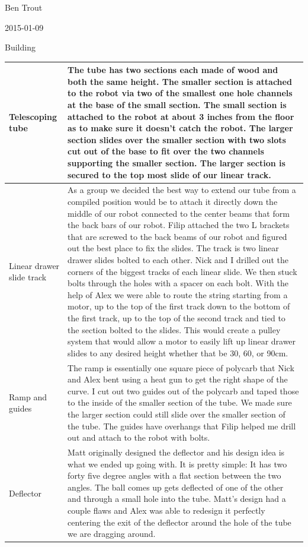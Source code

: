 Ben Trout

2015-01-09

Building

\begin{tabular}{|p{4cm}|p{8cm}|}
\hline
Telescoping tube&
The tube has two sections each made of wood and both the same height. The smaller section is attached to the robot via two of the smallest one hole channels at the base of the small section. The small section is attached to the robot at about 3 inches from the floor as to make sure it doesn’t catch the robot. The larger section slides over the smaller section with two slots cut out of the base to fit over the two channels supporting the smaller section. The larger section is secured to the top most slide of our linear track. 
\\
\hline
Linear drawer slide track&
As a group we decided the best way to extend our tube from a compiled position would be to attach it directly down the middle of our robot connected to the center beams that form the back bars of our robot. Filip attached the two L brackets that are screwed to the back beams of our robot and figured out the best place to fix the slides. The track is two linear drawer slides bolted to each other. Nick and I drilled out the corners of the biggest tracks of each linear slide. We then stuck bolts through the holes with a spacer on each bolt. With the help of Alex we were able to route the string starting from a motor, up to the top of the first track down to the bottom of the first track, up to the top of the second track and tied to the section bolted to the slides. This would create a pulley system that would allow a motor to easily lift up linear drawer slides to any desired height whether that be 30, 60, or 90cm. 
\\
\hline
Ramp and guides&
The ramp is essentially one square piece of polycarb that Nick and Alex bent using a heat gun to get the right shape of the curve. I cut out two guides out of the polycarb and taped those to the inside of the smaller section of the tube. We made sure the larger section could still slide over the smaller section of the tube. The guides have overhangs that Filip helped me drill out and attach to the robot with bolts.
\\
\hline
Deflector&
Matt originally designed the deflector and his design idea is what we ended up going with. It is pretty simple: It has two forty five degree angles with a flat section between the two angles. The ball comes up gets deflected of one of the other and through a small hole into the tube. Matt’s design had a couple flaws and Alex was able to redesign it perfectly centering the exit of the deflector around the hole of the tube we are dragging around. 
\\
\hline
\end{tabular}

